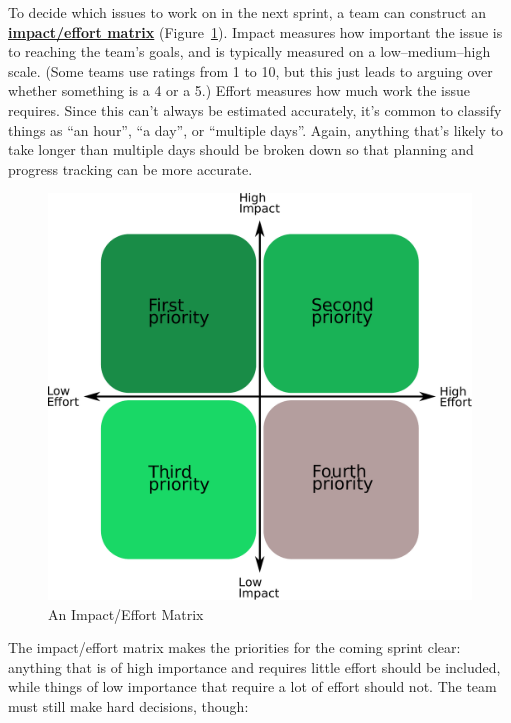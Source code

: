 \documentclass[
]{krantz}
\newcommand{\gref}[2]{\hyperlink{#2}{\textbf{#1}}}
\begin{document}
To decide which issues to work on in the next sprint,
a team can construct an \gref{impact/effort matrix}{impact\_effort\_matrix}
(Figure~\ref{fig:teams-impact-effort}).
Impact measures how important the issue is to reaching the team's goals,
and is typically measured on a low--medium--high scale.
(Some teams use ratings from 1 to 10,
but this just leads to arguing over whether something is a 4 or a 5.)
Effort measures how much work the issue requires.
Since this can't always be estimated accurately,
it's common to classify things as ``an hour'', ``a day'', or ``multiple days''.
Again,
anything that's likely to take longer than multiple days should be broken down
so that planning and progress tracking can be more accurate.

\begin{figure}

{\centering \includegraphics[width=1\linewidth]{figures/teams/effort-impact-matrix} 

}

\caption{An Impact/Effort Matrix}\label{fig:teams-impact-effort}
\end{figure}

The impact/effort matrix makes the priorities for the coming sprint clear:
anything that is of high importance and requires little effort should be included,
while things of low importance that require a lot of effort should not.
The team must still make hard decisions, though:
\end{document}
